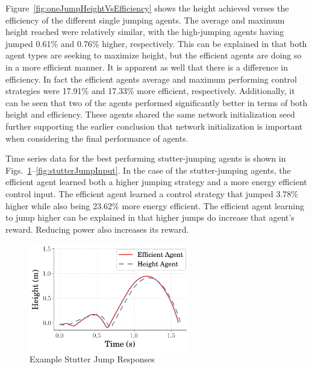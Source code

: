 \documentclass{ifacconf}
\begin{document}
   Figure~\ref{fig:oneJumpHeightVsEfficiency} shows the height achieved verses the efficiency of the different single jumping agents. The average and maximum height reached were relatively similar, with the high-jumping agents having jumped 0.61\% and 0.76\% higher, respectively. This can be explained in that both agent types are seeking to maximize height, but the efficient agents are doing so in a more efficient manner. It is apparent as well that there is a difference in efficiency. In fact the efficient agents average and maximum performing control strategies were 17.91\% and 17.33\% more efficient, respectively. Additionally, it can be seen that two of the agents performed significantly better in terms of both height and efficiency. These agents shared the same network initialization seed further supporting the earlier conclusion that network initialization is important when considering the final performance of agents.
   
   Time series data for the best performing stutter-jumping agents is shown in Figs.~\ref{fig:stutterJumpPosition}--\ref{fig:stutterJumpInput}. In the case of the stutter-jumping agents, the efficient agent learned both a higher jumping strategy and a more energy efficient control input. The efficient agent learned a control strategy that jumped 3.78\% higher while also being 23.62\% more energy efficient. The efficient agent learning to jump higher can be explained in that higher jumps do increase that agent's reward. Reducing power also increases its reward.

\begin{figure}[tb]
      \begin{center}
         \includegraphics[width=7cm]{figures/timeseries/PositionVsTime_StutterJump.png}    %
         \caption{Example Stutter Jump Responses} 
         \label{fig:stutterJumpPosition}
      \end{center}
   \end{figure} 
   
\end{document}
